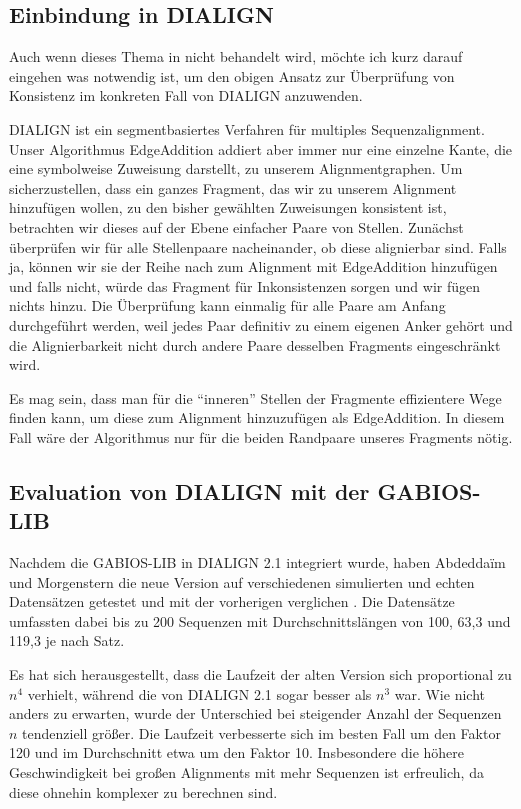 \subsection{Einbindung in DIALIGN}

Auch wenn dieses Thema in \cite{am00} nicht behandelt wird, möchte ich kurz darauf eingehen was notwendig ist, um den obigen Ansatz zur Überprüfung von Konsistenz im konkreten Fall von DIALIGN anzuwenden. 

DIALIGN ist ein segmentbasiertes Verfahren für multiples Sequenzalignment. Unser Algorithmus \textrm{EdgeAddition} addiert aber immer nur eine einzelne Kante, die eine symbolweise Zuweisung darstellt, zu unserem Alignmentgraphen. Um sicherzustellen, dass ein ganzes Fragment, das wir zu unserem Alignment hinzufügen wollen, zu den bisher gewählten Zuweisungen konsistent ist, betrachten wir dieses auf der Ebene einfacher Paare von Stellen. Zunächst überprüfen wir für alle Stellenpaare nacheinander, ob diese alignierbar sind. Falls ja, können wir sie der Reihe nach zum Alignment mit \textrm{EdgeAddition} hinzufügen und falls nicht, würde das Fragment für Inkonsistenzen sorgen und wir fügen nichts hinzu. Die Überprüfung kann einmalig für alle Paare am Anfang durchgeführt werden, weil jedes Paar definitiv zu einem eigenen Anker gehört und die Alignierbarkeit nicht durch andere Paare desselben Fragments eingeschränkt wird.

Es mag sein, dass man für die \enquote{inneren} Stellen der Fragmente effizientere Wege finden kann, um diese zum Alignment hinzuzufügen als \textrm{EdgeAddition}. In diesem Fall wäre der Algorithmus nur für die beiden Randpaare unseres Fragments nötig.

\subsection{Evaluation von DIALIGN mit der GABIOS-LIB}

Nachdem die GABIOS-LIB in DIALIGN 2.1 integriert wurde, haben Abdedda\"im und Morgenstern die neue Version auf verschiedenen simulierten und echten Datensätzen getestet und mit der vorherigen verglichen \citep{am00}. Die Datensätze umfassten dabei bis zu 200 Sequenzen mit Durchschnittslängen von 100, 63,3 und 119,3 je nach Satz. 

Es hat sich herausgestellt, dass die Laufzeit der alten Version sich proportional zu $n^4$ verhielt, während die von DIALIGN 2.1 sogar besser als $n^3$ war. Wie nicht anders zu erwarten, wurde der Unterschied bei steigender Anzahl der Sequenzen $n$ tendenziell größer. Die Laufzeit verbesserte sich im besten Fall um den Faktor 120 und im Durchschnitt etwa um den Faktor 10. Insbesondere die höhere Geschwindigkeit bei großen Alignments mit mehr Sequenzen ist erfreulich, da diese ohnehin komplexer zu berechnen sind.

